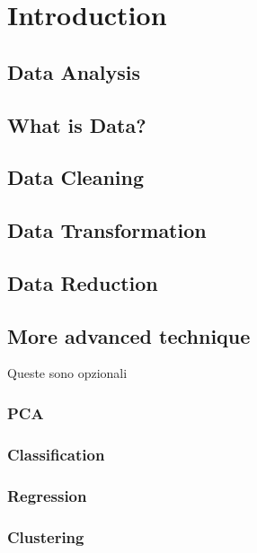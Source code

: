 \chapter{Introduction}

\section{Data Analysis}


\section{What is Data?}

\clearpage

\section{Data Cleaning}

\section{Data Transformation}

\section{Data Reduction}

\section{More advanced technique}

Queste sono opzionali
\subsection{PCA}
\subsection{Classification}
\subsection{Regression}
\subsection{Clustering}